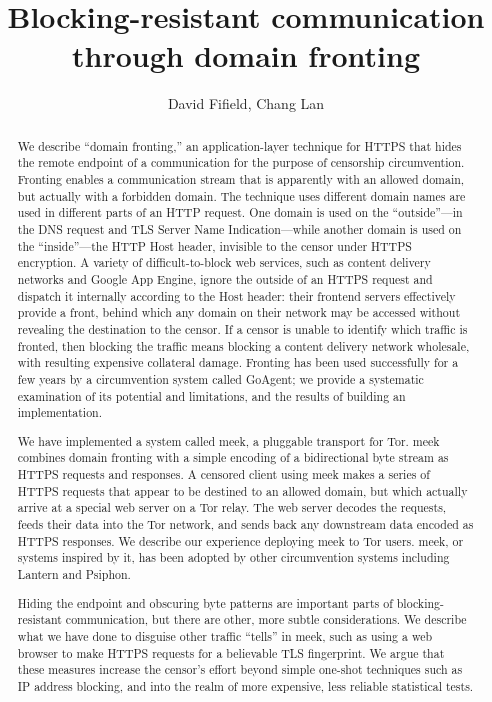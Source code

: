 \documentclass[conference]{IEEEtran}
\begin{document}
\title{Blocking-resistant communication\\through domain fronting}

\author{David Fifield, Chang Lan}
\author{
}

\maketitle

\begin{abstract}
We describe ``domain fronting,'' an application-layer technique
for HTTPS
that hides the remote endpoint of a communication
for the purpose of censorship circumvention.
Fronting enables a communication stream that is apparently with an allowed domain,
but actually with a forbidden domain.
The technique uses different domain names are used in different
parts of an HTTP request.
One domain is used on the ``outside''---in the DNS request and
TLS Server Name Indication---while another domain is used
on the ``inside''---the HTTP Host header, invisible to the
censor under HTTPS encryption.
A variety of difficult-to-block web services, such as content delivery networks
and Google App Engine, ignore the outside of an HTTPS request
and dispatch it internally according to the Host header:
their frontend servers effectively provide a front,
behind which any domain on their network may be accessed
without revealing the destination to the censor.
If a censor is unable to identify which traffic is fronted,
then blocking the traffic means blocking a content delivery network wholesale,
with resulting expensive collateral damage.
Fronting has been used successfully for a few years by a circumvention system called GoAgent;
we provide a systematic examination of its potential and limitations,
and the results of building an implementation.

We have implemented a system called meek,
a pluggable transport for Tor.
meek combines domain fronting with a simple encoding of a bidirectional byte stream
as HTTPS requests and responses.
A censored client using meek makes a series of HTTPS requests
that appear to be destined to an allowed domain,
but which actually arrive at a special web server on a Tor relay.
The web server decodes the requests, feeds their data into the Tor network,
and sends back any downstream data encoded as HTTPS responses.
We describe our experience deploying meek to Tor users.
meek, or systems inspired by it,
has been adopted by other circumvention systems including Lantern and Psiphon.

Hiding the endpoint and obscuring byte patterns are important parts of blocking-resistant communication,
but there are other, more subtle considerations.
We describe what we have done to disguise other traffic ``tells'' in meek,
such as using a web browser to make HTTPS requests
for a believable TLS fingerprint.
We argue that these measures increase the censor's effort
beyond simple one-shot techniques such as IP address blocking, and into
the realm of more expensive, less reliable statistical tests.
\end{abstract}
\end{document}
